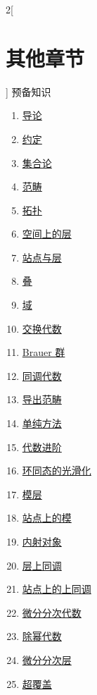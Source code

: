 \begin{multicols}{2}[\section{其他章节}]
\noindent
预备知识
\begin{enumerate}
\item \hyperref[introduction-section-phantom]{导论}
\item \hyperref[conventions-section-phantom]{约定}
\item \hyperref[sets-section-phantom]{集合论}
\item \hyperref[categories-section-phantom]{范畴}
\item \hyperref[topology-section-phantom]{拓扑}
\item \hyperref[sheaves-section-phantom]{空间上的层}
\item \hyperref[sites-section-phantom]{站点与层}
\item \hyperref[stacks-section-phantom]{叠}
\item \hyperref[fields-section-phantom]{域}
\item \hyperref[algebra-section-phantom]{交换代数}
\item \hyperref[brauer-section-phantom]{Brauer 群}
\item \hyperref[homology-section-phantom]{同调代数}
\item \hyperref[derived-section-phantom]{导出范畴}
\item \hyperref[simplicial-section-phantom]{单纯方法}
\item \hyperref[more-algebra-section-phantom]{代数进阶}
\item \hyperref[smoothing-section-phantom]{环同态的光滑化}
\item \hyperref[modules-section-phantom]{模层}
\item \hyperref[sites-modules-section-phantom]{站点上的模}
\item \hyperref[injectives-section-phantom]{内射对象}
\item \hyperref[cohomology-section-phantom]{层上同调}
\item \hyperref[sites-cohomology-section-phantom]{站点上的上同调}
\item \hyperref[dga-section-phantom]{微分分次代数}
\item \hyperref[dpa-section-phantom]{除幂代数}
\item \hyperref[sdga-section-phantom]{微分分次层}
\item \hyperref[hypercovering-section-phantom]{超覆盖}

\end{enumerate}
\end{multicols}
